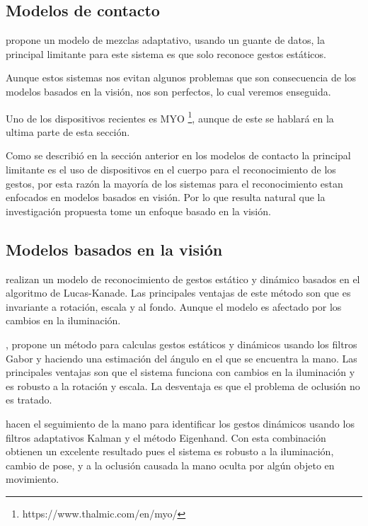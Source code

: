 \subsection{Modelos de contacto}

\citep{Yoon2012} propone un modelo de mezclas adaptativo, usando un guante de datos, la principal limitante para este sistema es que solo reconoce gestos estáticos. 

Aunque estos sistemas nos evitan algunos problemas que son consecuencia de los modelos basados en la visión, nos son perfectos, lo cual veremos enseguida.  

Uno de los dispositivos recientes es MYO \footnote{https://www.thalmic.com/en/myo/}, aunque de este se hablar\'a en la ultima parte de esta secci\'on. 

Como se describi\'o en la secci\'on anterior en los modelos de contacto la principal limitante es el uso de dispositivos en el cuerpo para el reconocimiento de los gestos, por esta raz\'on la mayor\'ia de los sistemas para el reconocimiento estan enfocados en modelos basados en visi\'on. Por lo que resulta natural que la investigaci\'on propuesta tome un enfoque basado en la visi\'on.

\subsection{Modelos basados en la visi\'on}  

\cite{Premaratne2013} realizan un modelo de reconocimiento de gestos est\'atico y din\'amico basados en el algoritmo de Lucas-Kanade. Las principales ventajas de este m\'etodo son que es invariante a rotaci\'on, escala y al fondo. Aunque el modelo es afectado por los cambios en la iluminaci\'on.

\citep{Huang2011}, propone un método para calculas gestos estáticos y dinámicos usando los filtros Gabor y haciendo una estimación del \'angulo en el que se encuentra la mano. Las principales ventajas son que el sistema funciona con cambios en la iluminaci\'on y es robusto a la rotaci\'on y escala. La desventaja es que el problema de oclusi\'on no es tratado.

\citep{MohdAsaari2014} hacen el seguimiento de la mano para identificar los gestos din\'amicos usando los filtros adaptativos Kalman y el m\'etodo Eigenhand. Con esta combinaci\'on obtienen un excelente resultado pues el sistema es robusto a la iluminaci\'on, cambio de pose, y a la oclusi\'on causada la mano oculta por alg\'un objeto en movimiento. 

